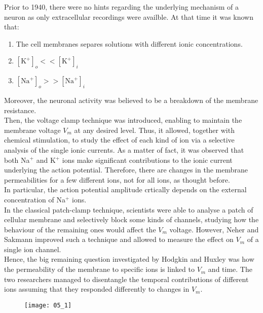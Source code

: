 Prior to 1940, there were no hints regarding the underlying mechanism of a neuron
as only extracellular recordings were availble. At that time it was known that:
\begin{enumerate}
    \item The cell membranes separes solutions with different ionic concentrations.
    \item \([\text{K}^{+}]_{o}<<[\text{K}^{+}]_{i}\)
    \item \([\text{Na}^{+}]_{o}>>[\text{Na}^{+}]_{i}\)
\end{enumerate}
Moreover, the neuronal activity was believed to be a breakdown of the membrane resistance.\\
Then, the voltage clamp technique was introduced, enabling to maintain the membrane
voltage \(V_{m}\) at any desired level. Thus, it allowed, together with chemical stimulation,
to study the effect of each kind of ion via a selective analysis of the single ionic currents.
As a matter of fact, it was observed that both Na\({}^{+}\) and K\({}^{+}\) ions make significant
contributions to the ionic current underlying the action potential. Therefore, there are changes
in the membrane permeabilities for a few different ions, not for all ions, as thought before.\\
In particular, the action potential amplitude crtically depends on the external concentration of
Na\({}^{+}\) ions.\\
In the classical patch-clamp technique, scientists were able to analyse a patch of cellular membrane
and selectively block some kinds of channels, studying how the behaviour of the remaining ones would
affect the \(V_{m}\) voltage. However, Neher and Sakmann improved such a technique and allowed to
measure the effect on \(V_{m}\) of a single ion channel.\\
Hence, the big remaining question investigated by Hodgkin and Huxley was how the permeability of the
membrane to specific ions is linked to \(V_{m}\) and time. The two researchers managed to
disentangle the temporal contributions of different ions assuming that they responded
differently to changes in \(V_{m}\).
\begin{figure}[H]
    \texttt{[image: 05\_1]}
    \centering
\end{figure}

